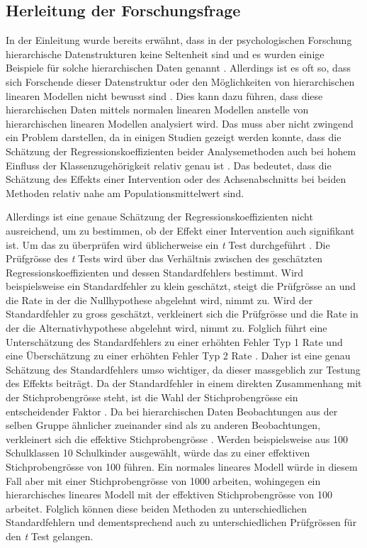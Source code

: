 \documentclass[12pt]{article}\usepackage[]{graphicx}\usepackage[]{color}
\begin{document}
\subsection{Herleitung der Forschungsfrage}
In der Einleitung wurde bereits erwähnt, dass in der psychologischen Forschung hierarchische Datenstrukturen keine Seltenheit sind und es wurden einige Beispiele für solche hierarchischen Daten genannt \citep{raudenbush2002hierarchical,SnijdersTomA.B2012Ma:a,woltman2012introduction}. Allerdings ist es oft so, dass sich Forschende dieser Datenstruktur oder den Möglichkeiten von hierarchischen linearen Modellen nicht bewusst sind \citep{mcneish2014analyzing}. Dies kann dazu führen, dass diese hierarchischen Daten mittels normalen linearen Modellen anstelle von hierarchischen linearen Modellen analysiert wird. Das muss aber nicht zwingend ein Problem darstellen, da in einigen Studien gezeigt werden konnte, dass die Schätzung der Regressionskoeffizienten beider Analysemethoden auch bei hohem Einfluss der Klassenzugehörigkeit relativ genau ist \citep{mcneish2014analyzing, mundfrom2002monte}. Das bedeutet, dass die Schätzung des Effekts einer Intervention oder des Achsenabschnitts bei beiden Methoden relativ nahe am Populationsmittelwert sind. 

Allerdings ist eine genaue Schätzung der Regressionskoeffizienten nicht ausreichend, um zu bestimmen, ob der Effekt einer Intervention auch signifikant ist. Um das zu überprüfen wird üblicherweise ein \textit{t} Test durchgeführt \citep{SnijdersTomA.B2012Ma:a}. Die Prüfgrösse des \textit{t} Tests wird über das Verhältnis zwischen des geschätzten Regressionskoeffizienten und dessen Standardfehlers bestimmt. Wird beispielsweise ein Standardfehler zu klein geschätzt, steigt die Prüfgrösse an und die Rate in der die Nullhypothese abgelehnt wird, nimmt zu. Wird der Standardfehler zu gross geschätzt, verkleinert sich die Prüfgrösse und die Rate in der die Alternativhypothese abgelehnt wird, nimmt zu. Folglich führt eine Unterschätzung des Standardfehlers zu einer erhöhten Fehler Typ 1 Rate und eine Überschätzung zu einer erhöhten Fehler Typ 2 Rate \citep{SnijdersTomA.B2012Ma:a}. Daher ist eine genau Schätzung des Standardfehlers umso wichtiger, da dieser massgeblich zur Testung des Effekts beiträgt. Da der Standardfehler in einem direkten Zusammenhang mit der Stichprobengrösse steht, ist die Wahl der Stichprobengrösse ein entscheidender Faktor \citep{mcneish2014analyzing, SnijdersTomA.B2012Ma:a}. Da bei hierarchischen Daten Beobachtungen aus der selben Gruppe ähnlicher zueinander sind als zu anderen Beobachtungen, verkleinert sich die effektive Stichprobengrösse \citep{raudenbush2002hierarchical}. Werden beispielsweise aus 100 Schulklassen 10 Schulkinder ausgewählt, würde das zu einer effektiven Stichprobengrösse von 100 führen. Ein normales lineares Modell würde in diesem Fall aber mit einer Stichprobengrösse von 1000 arbeiten, wohingegen ein hierarchisches lineares Modell mit der effektiven Stichprobengrösse von 100 arbeitet. Folglich können diese beiden Methoden zu unterschiedlichen Standardfehlern und dementsprechend auch zu unterschiedlichen Prüfgrössen für den \textit{t} Test gelangen.
\end{document}
